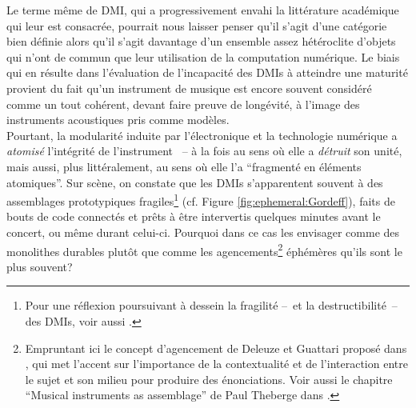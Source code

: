 \noindent Le terme même de \gls{DMI}, qui a progressivement envahi la littérature académique qui leur est consacrée, pourrait nous laisser penser qu'il s'agit d'une catégorie bien définie alors qu'il s'agit davantage d'un ensemble assez hétéroclite d'objets qui n'ont de commun que leur utilisation de la computation numérique. Le biais qui en résulte dans l'évaluation de l'incapacité des \glspl{DMI} à atteindre une maturité provient du fait qu'un instrument de musique est encore souvent considéré comme un tout cohérent, devant faire preuve de longévité, à l’image des instruments acoustiques pris comme modèles.\\
\indent Pourtant, la modularité induite par l'électronique et la technologie numérique a \textit{atomisé} l'intégrité de l'instrument ~-- à la fois au sens où elle a \textit{détruit} son unité, mais aussi, plus littéralement, au sens où elle l'a ``fragmenté en éléments atomiques''. 
Sur scène, on constate que les \glspl{DMI} s'apparentent souvent à des assemblages prototypiques fragiles\footnote{Pour une réflexion poursuivant à dessein la fragilité --~et la destructibilité~-- des \glspl{DMI}, voir aussi \cite{berthaut_wubbles:_2014, haddad_fragile_2017}.} (cf. Figure \ref{fig:ephemeral:Gordeff}), faits de bouts de code connectés et prêts à être intervertis quelques minutes avant le concert, ou même durant celui-ci. Pourquoi dans ce cas les envisager comme des monolithes durables plutôt que comme les agencements\footnote{Empruntant ici le concept d'agencement de Deleuze et Guattari proposé dans \cite{deleuze_mille_1980}, qui met l'accent sur l'importance de la contextualité et de l'interaction entre le sujet et son milieu pour produire des énonciations. Voir aussi le chapitre ``Musical instruments as assemblage'' de Paul Theberge dans \cite{bovermann_musical_2017}.} éphémères qu’ils sont le plus souvent?\\
